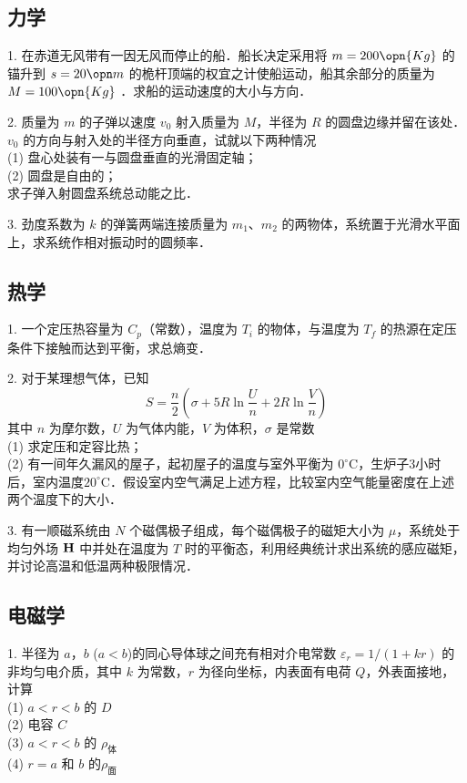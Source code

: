 \subsection{力学}
1. 在赤道无风带有一因无风而停止的船．船长决定采用将 $m=200\opn{Kg}$ 的锚升到 $s=20\opn m$ 的桅杆顶端的权宜之计使船运动，船其余部分的质量为 $M=100 \opn{Kg}$ ．求船的运动速度的大小与方向．

2. 质量为 $m$ 的子弹以速度 $v_0$ 射入质量为 $M$，半径为 $R$ 的圆盘边缘并留在该处．$v_0$ 的方向与射入处的半径方向垂直，试就以下两种情况\\
(1) 盘心处装有一与圆盘垂直的光滑固定轴；\\
(2) 圆盘是自由的；\\
求子弹入射圆盘系统总动能之比．

3. 劲度系数为 $k$ 的弹簧两端连接质量为 $m_1$、$m_2$ 的两物体，系统置于光滑水平面上，求系统作相对振动时的圆频率．
\subsection{热学}
1. 一个定压热容量为 $C_p$（常数），温度为 $T_i$ 的物体，与温度为 $T_f$ 的热源在定压条件下接触而达到平衡，求总熵变．

2. 对于某理想气体，已知
\begin{equation}
S=\frac n2 (\sigma+5R\ln{\frac Un}+2R\ln{\frac Vn})
\end{equation}
其中 $n$ 为摩尔数，$U$ 为气体内能，$V$ 为体积，$\sigma$ 是常数\\
(1) 求定压和定容比热；\\
(2) 有一间年久漏风的屋子，起初屋子的温度与室外平衡为 $0^\circ\mathrm{C}$，生炉子3小时后，室内温度$20^\circ\mathrm{C}$．假设室内空气满足上述方程，比较室内空气能量密度在上述两个温度下的大小．

3. 有一顺磁系统由 $N$ 个磁偶极子组成，每个磁偶极子的磁矩大小为 $\mu$，系统处于均匀外场 $\bf H$ 中并处在温度为 $T$ 时的平衡态，利用经典统计求出系统的感应磁矩，并讨论高温和低温两种极限情况．
\subsection{电磁学}
1. 半径为 $a$，$b$ ($a<b$)的同心导体球之间充有相对介电常数 $\varepsilon_r=1/(1+kr)$ 的非均匀电介质，其中 $k$ 为常数，$r$ 为径向坐标，内表面有电荷 $Q$，外表面接地，计算\\
(1) $ a<r<b $ 的 $D$\\
(2) 电容 $C$\\
(3) $ a<r<b $ 的 $\rho_{\text{体}}$\\
(4) $ r=a $ 和 $b$ 的$\rho_{\text{面}}$


